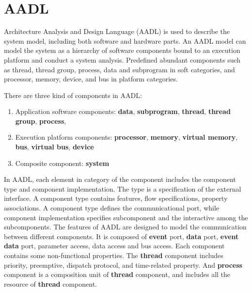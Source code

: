 
\section{AADL}

Architecture Analysis and Design Language (AADL) is used to describe the system model, including both software and hardware parts. An AADL model can model the system as a hierarchy of software components bound to an execution platform and conduct a system analysis. Predefined abundant components such as thread, thread group, process, data and subprogram in soft categories, and processor, memory, device, and bus in platform categories. 

There are three kind of components in AADL:
\begin{enumerate}
\item Application software components: \textbf{data}, \textbf{subprogram}, \textbf{thread}, \textbf{thread group}, \textbf{process}, 
\item Execution platform components: \textbf{processor}, \textbf{memory}, \textbf{virtual memory}, \textbf{bus}, \textbf{virtual bus}, \textbf{device}
\item Composite component: \textbf{system}
\end{enumerate}


In AADL, each element in category of the component includes the component type and component implementation. The type is a specification of the external interface. A component type contains features, flow specifications, property associations. A component type defines the communicational port, while component implementation specifies subcomponent and the interactive among the subcomponents. The features of AADL are designed to model the communication between different components. It is composed of \textbf{event} port, \textbf{data} port, \textbf{event data} port, parameter access, data access and bus access. Each component contains some non-functional properties. The \textbf{thread} component includes priority, preemptive, dispatch protocol, and time-related property. And \textbf{process} component is a composition unit of \textbf{thread} component, and includes all the resource of \textbf{thread} component. 






